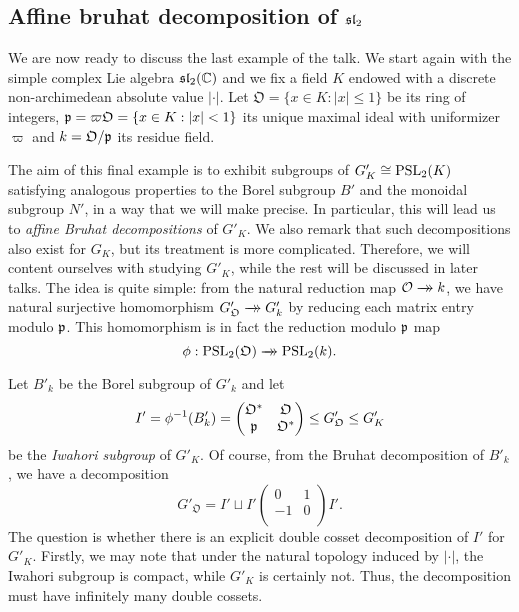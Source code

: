 \subsection{Affine bruhat decomposition of \texorpdfstring{$\mathfrak{sl}_2$}{PDFstring}}

We are now ready to discuss the last example of the talk. We start again with the simple complex Lie algebra $\mathfrak{sl}_2(\mathbb{C})$ and we fix a field $K$ endowed with a discrete non-archimedean absolute value $|\cdot|$. Let $\mathfrak{O}=\{x\in K:|x|\leq 1\}$ be its ring of integers, $\mathfrak{p}=\varpi\mathfrak{O}=\{x\in K:|x|<1\}$ its unique maximal ideal with uniformizer $\varpi$ and $k=\mathfrak{O}/\mathfrak{p}$ its residue field.


The aim of this final example is to exhibit subgroups of $G'_K\cong\mathrm{PSL}_2(K)$ satisfying analogous properties to the Borel subgroup $B'$ and the monoidal subgroup $N'$, in a way that we will make precise. In particular, this will lead us to \textit{affine Bruhat decompositions} of $G'_K$. We also remark that such decompositions also exist for $G_K$, but its treatment is more complicated. Therefore, we will content ourselves with studying $G'_K$, while the rest will be discussed in later talks. The idea is quite simple: from the natural reduction map $\mathcal{O}\xrightarrow[]{}\mathrel{\mkern-14mu}\rightarrow k$, we have natural surjective homomorphism $G'_{\mathfrak{O}}\xrightarrow[]{}\mathrel{\mkern-14mu}\rightarrow G'_k$ by reducing each matrix entry modulo $\mathfrak{p}$. This homomorphism is in fact the reduction modulo $\mathfrak{p}$ map $$\phi:\mathrm{PSL}_2(\mathfrak{O})\xrightarrow[]{}\mathrel{\mkern-14mu}\rightarrow\mathrm{PSL}_2(k).$$

Let $B'_k$ be the Borel subgroup of $G'_k$ and let $$I'=\phi^{-1}(B'_k)=\begin{pmatrix}
    \mathfrak{O}^* & \mathfrak{O}\\
    \mathfrak{p} & \mathfrak{O}^*\\
\end{pmatrix}\leq G'_\mathfrak{O}\leq G'_K$$
be the \textit{Iwahori subgroup} of $G'_K$. Of course, from the Bruhat decomposition of $B'_k$, we have a decomposition 
$$G'_\mathfrak{O}=I'\sqcup I'\begin{pmatrix}
    0 & 1\\
    -1 & 0\\
\end{pmatrix}I'.$$
The question is whether there is an explicit double cosset decomposition of $I'$ for $G'_K$. Firstly, we may note that under the natural topology induced by $|\cdot|$, the Iwahori subgroup is compact, while $G'_K$ is certainly not. Thus, the decomposition must have infinitely many double cossets.

